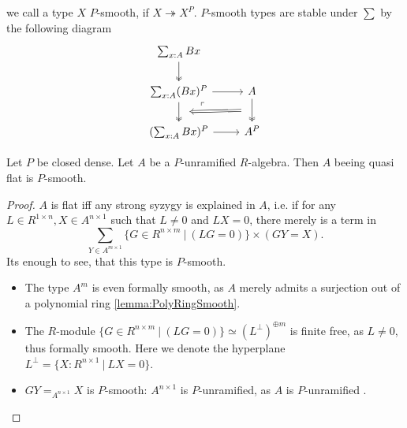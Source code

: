 	 we call a type $X$ $P$-smooth, if $X \twoheadrightarrow X^P$. $P$-smooth types are stable under $\sum$ by the following diagram
\[\begin{tikzcd}
	{\sum_{x : A} B x} \\
	{\sum_{x :A} (Bx) ^P} & A \\
	{(\sum_{x :A} Bx)^P} & {A^P}
	\arrow[two heads, from=1-1, to=2-1]
	\arrow[from=2-1, to=2-2]
	\arrow[""{name=0, anchor=center, inner sep=0}, two heads, from=2-1, to=3-1]
	\arrow["\ulcorner"{anchor=center, pos=0.125}, draw=none, from=2-1, to=3-2]
	\arrow[""{name=1, anchor=center, inner sep=0}, two heads, from=2-2, to=3-2]
	\arrow[from=3-1, to=3-2]
	\arrow[shorten <=9pt, shorten >=9pt, Rightarrow, from=1, to=0]
\end{tikzcd}\]
\begin{lemma}{\label{lemma:FlatForStdEtAlg}}
	Let $P$ be closed dense. Let $A$ be a $P$-unramified $R$-algebra. Then $A$ beeing quasi flat is $P$-smooth. %
\end{lemma}
\begin{proof}
	$A$ is flat iff any strong syzygy is explained in $A$, i.e. if for any $L \in R^{1 \times n} , X \in A^{n \times 1}$ such that $L \neq 0$ and $L X = 0$, there merely is a term in
	\[
	\sum_{Y \in A^{m\times 1}} \{ G \in R^{n \times m} \ | \ (L G = 0) \} \times (G Y = X).\]	
	Its enough to see, that this type is $P$-smooth.
	\begin{itemize}
		\item 	The type $A^m$ is even formally smooth, as $A$ merely admits a surjection out of a polynomial ring \ref{lemma:PolyRingSmooth}. \\
		\item The $R$-module $\{ G \in R^{n \times m} \ | \ (L G = 0) \} \simeq (L^\bot)^{\oplus m}$ is finite free, as $L \neq 0$, thus formally smooth. Here we denote the hyperplane  $L^\bot = \{X :  R^{n \times 1} \ | \ L X = 0 \}$.
		\item $G Y =_{A^{n \times 1}} X$ is $P$-smooth: $A^{n \times 1}$ is $P$-unramified, as $A$ is $P$-unramified .
	\end{itemize}
\end{proof}
